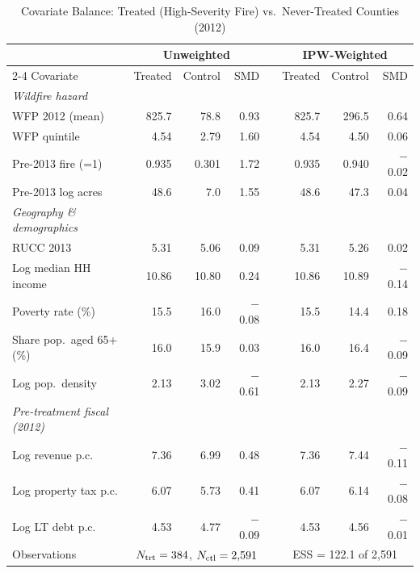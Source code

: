 \documentclass[12pt]{article}
\begin{document}
\begin{table}[h!]
\begin{threeparttable}
\caption{Covariate Balance: Treated (High-Severity Fire) vs.\ Never-Treated Counties (2012)}
\label{tab:balance}
\centering
\footnotesize
\begin{tabular}{lrrrrrrr}
\toprule
 & \multicolumn{3}{c}{Unweighted} & \phantom{abc} &
   \multicolumn{3}{c}{IPW-Weighted} \\
\cmidrule{2-4} \cmidrule{6-8}
Covariate & Treated & Control & SMD & & Treated & Control & SMD \\
\midrule
\textit{Wildfire hazard} \\
\quad WFP 2012 (mean)        &  825.7 &  78.8 & 0.93 & &  825.7 &  296.5 & 0.64 \\
\quad WFP quintile           &   4.54 &   2.79 & 1.60 & &   4.54 &    4.50 & 0.06 \\
\quad Pre-2013 fire (=1)     &  0.935 &  0.301 & 1.72 & &  0.935 &   0.940 &$-$0.02 \\
\quad Pre-2013 log acres     &  48.6  &   7.0 & 1.55 & &  48.6  &   47.3 & 0.04 \\
\addlinespace
\textit{Geography \& demographics} \\
\quad RUCC 2013              &   5.31 &   5.06 & 0.09 & &   5.31 &    5.26 & 0.02 \\
\quad Log median HH income   & 10.86 & 10.80 & 0.24 & &10.86 &  10.89 &$-$0.14\\
\quad Poverty rate (\%)      & 15.5  &  16.0 &$-$0.08& & 15.5  &   14.4 & 0.18 \\
\quad Share pop.\ aged 65+ (\%)& 16.0  & 15.9 & 0.03 & & 16.0  &   16.4 &$-$0.09\\
\quad Log pop.\ density      &  2.13 &  3.02 &$-$0.61& & 2.13 &   2.27 &$-$0.09\\
\addlinespace
\textit{Pre-treatment fiscal (2012)} \\
\quad Log revenue p.c.       &  7.36 &  6.99 & 0.48 & &  7.36 &   7.44 &$-$0.11 \\
\quad Log property tax p.c.  &  6.07 &  5.73 & 0.41 & &  6.07 &   6.14 &$-$0.08 \\
\quad Log LT debt p.c.       &  4.53 &  4.77 &$-$0.09& & 4.53 &   4.56 &$-$0.01\\
\midrule
Observations                 & \multicolumn{3}{c}{$N_{\rm trt}=384$, $N_{\rm ctl}=2{,}591$} & &
                               \multicolumn{3}{c}{ESS = 122.1 of 2{,}591} \\
\bottomrule
\end{tabular}

\end{threeparttable}
\end{table}
\end{document}
